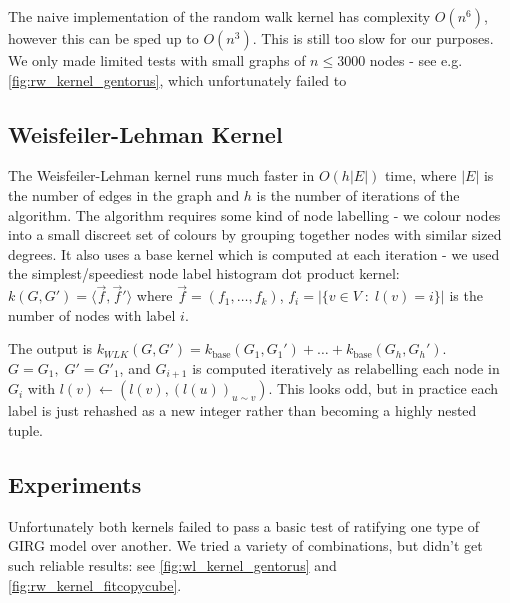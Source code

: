 The naive implementation of the random walk kernel has complexity $O(n^6)$, however this can be sped up to $O(n^3)$. This is still too slow for our purposes. We only made limited tests with small graphs of $n \leq 3000$ nodes - see e.g. \cref{fig:rw_kernel_gentorus}, which unfortunately failed to 

\subsection{Weisfeiler-Lehman Kernel}
The Weisfeiler-Lehman kernel runs much faster in $O(h|E|)$ time, where $|E|$ is the number of edges in the graph and $h$ is the number of iterations of the algorithm. The algorithm requires some kind of node labelling - we colour nodes into a small discreet set of colours by grouping together nodes with similar sized degrees. It also uses a base kernel which is computed at each iteration - we used the simplest/speediest node label histogram dot product kernel: $k(G, G') = \langle \vec{f}, \vec{f}' \rangle$ where $\vec{f} = (f_1, \dots, f_k)$, $f_i = |\{ v \in V \;:\; l(v) = i\}|$ is the number of nodes with label $i$.

The output is $k_{WLK}(G, G') = k_{\text{base}}(G_1, G_1') + \dots + k_{\text{base}}(G_h, G_h')$. $G=G_1,\; G' = G'_1$, and $G_{i+1}$ is computed iteratively as relabelling each node in $G_i$ with $l(v) \gets (l(v), (l(u))_{u \sim v})$. This looks odd, but in practice each label is just rehashed as a new integer rather than becoming a highly nested tuple.



\subsection{Experiments}

Unfortunately both kernels failed to pass a basic test of ratifying one type of GIRG model over another. We tried a variety of combinations, but didn't get such reliable results: see \cref{fig:wl_kernel_gentorus} and \cref{fig:rw_kernel_fitcopycube}.


